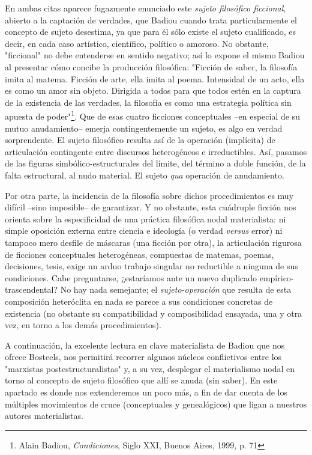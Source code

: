 \documentclass{book}
\begin{document}
En ambas citas aparece fugazmente enunciado este \emph{sujeto filosófico
ficcional}, abierto a la captación de verdades, que Badiou cuando trata
particularmente el concepto de sujeto desestima, ya que para él sólo
existe el sujeto cualificado, es decir, en cada caso artístico,
científico, político o amoroso. No obstante, "ficcional" no debe
entenderse en sentido negativo; así lo expone el mismo Badiou al
presentar cómo concibe la producción filosófica: "Ficción de saber, la
filosofía imita al matema. Ficción de arte, ella imita al poema.
Intensidad de un acto, ella es como un amor sin objeto. Dirigida a todos
para que todos estén en la captura de la existencia de las verdades, la
filosofía es como una estrategia política sin apuesta de
poder"\footnote{Alain Badiou, \emph{Condiciones}, Siglo XXI, Buenos
  Aires, 1999, p. 71}. Que de esas cuatro ficciones conceptuales --en
especial de su mutuo anudamiento-- emerja contingentemente un sujeto, es
algo en verdad sorprendente. El sujeto filosófico resulta así de la
operación (implícita) de articulación contingente entre discursos
heterogéneos e irreductibles. Así, pasamos de las figuras
simbólico-estructurales del límite, del término a doble función, de la
falta estructural, al nudo material. El sujeto \emph{qua} operación de
anudamiento.

Por otra parte, la incidencia de la filosofía sobre dichos
procedimientos es muy difícil --sino imposible-- de garantizar. Y no
obstante, esta cuádruple ficción nos orienta sobre la especificidad de
una práctica filosófica nodal materialista: ni simple oposición externa
entre ciencia e ideología (o verdad \emph{versus} error) ni tampoco mero
desfile de máscaras (una ficción por otra), la articulación rigurosa de
ficciones conceptuales heterogéneas, compuestas de matemas, poemas,
decisiones, tesis, exige un arduo trabajo singular no reductible a
ninguna de sus condiciones. Cabe preguntarse, ¿estaríamos ante un nuevo
duplicado empírico-trascendental? No hay nada semejante; el
\emph{sujeto-operación} que resulta de esta composición heteróclita en
nada se parece a sus condiciones concretas de existencia (no obstante su
compatibilidad y composibilidad ensayada, una y otra vez, en torno a los
demás procedimientos).

A continuación, la excelente lectura en clave materialista de Badiou que
nos ofrece Bosteels, nos permitirá recorrer algunos núcleos conflictivos
entre los "marxistas postestructuralistas" y, a su vez, desplegar el
materialismo nodal en torno al concepto de sujeto filosófico que allí se
anuda (sin saber). En este apartado es donde nos extenderemos un poco
más, a fin de dar cuenta de los múltiples movimientos de cruce
(conceptuales y genealógicos) que ligan a nuestros autores
materialistas.
\end{document}
